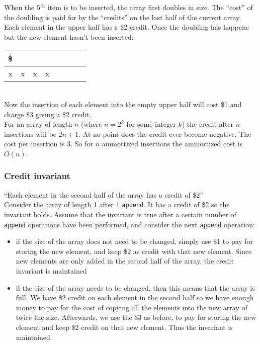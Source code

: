 \noindent When the 5$^{\textrm{th}}$ item is to be inserted, the array first doubles in size. The ``cost'' of the doubling is paid for by the ``credits'' on the last half of the current array. Each element in the upper half has a \$2 credit. Once the doubling has happene but the new element hasn't been inserted: \\

\begin{tabular}{| c | c | c | c | c | c | c | c |}
  \$ & & & & & & &  \\
  \hline x & x & x & x & & & & \\ \hline
\end{tabular} \\

\noindent Now the insertion of each element into the empty upper half will cost \$1 and charge \$3 giving a \$2 credit. \\

\noindent For an array of length $n$ (where $n = 2^k$ for some integer $k$) the credit after $n$ insertions will be $2n + 1$. At no point does the credit ever become negative. The cost per insertion is 3. So for $n$ ammortized insertions the ammortized cost is $O(n)$.

\subsubsection*{Credit invariant}

``Each element in the second half of the array has a credit of \$2'' \\

\noindent Consider the array of length 1 after 1 \texttt{append}. It has a credit of \$2 so the invariant holds. Assume that the invariant is true after a certain number of \texttt{append} operations have been performed, and consider the next \texttt{append} operation:

\begin{itemize}
  \item if the size of the array does not need to be changed, simply use \$1 to pay for storing the new element, and keep \$2 as credit with that new element.  Since new elements are only added in the second half of the array, the credit invariant is maintained
  \item if the size of the array needs to be changed, then this means that the array is full. We have \$2 credit on each element in the second half so we have enough money to pay for the cost of copying all the elements into the new array of twice the size. Afterwards, we use the \$3 as before, to pay for storing the new element and keep \$2 credit on that new element. Thus the invariant is maintained
\end{itemize}

